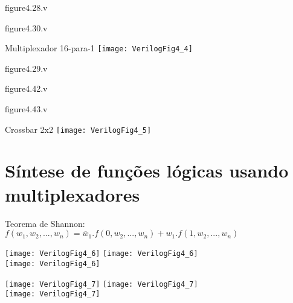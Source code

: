\begin{frame}[fragile]{figure4.28.v}
\end{frame} 

\begin{frame}[fragile]{figure4.30.v}
\end{frame} 


\begin{frame}{Multiplexador 16-para-1}   \centering
    \texttt{[image: VerilogFig4\_4]}
\end{frame}

\begin{frame}[fragile]{figure4.29.v}
\end{frame} 

\begin{frame}[fragile]{figure4.42.v}
\end{frame} 

\begin{frame}[fragile]{figure4.43.v}
\end{frame} 

\begin{frame}{Crossbar 2x2}   \centering
    \texttt{[image: VerilogFig4\_5]}
\end{frame}

\section{Síntese de funções lógicas usando multiplexadores}

\begin{frame}{\insertsection}
    Teorema de Shannon: \\
    $f(w_1,w_2,...,w_n)=\overline{w}_1.f(0,w_2,...,w_n)+w_1.f(1,w_2,...,w_n)$
\end{frame}

\begin{frame}{\insertsection}   \centering
    \texttt{[image: VerilogFig4\_6]}
    \texttt{[image: VerilogFig4\_6]} \\
    \texttt{[image: VerilogFig4\_6]} 
\end{frame}

\begin{frame}{\insertsection}   \centering
    \texttt{[image: VerilogFig4\_7]}
    \texttt{[image: VerilogFig4\_7]} \\
    \texttt{[image: VerilogFig4\_7]} 
\end{frame}


